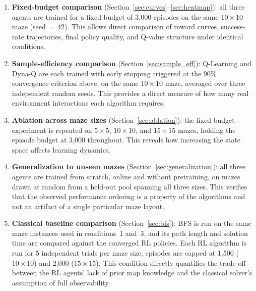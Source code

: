 \documentclass[11pt]{article}
\begin{document}
\begin{enumerate}
    \item \textbf{Fixed-budget comparison} (Section~\ref{sec:curves}--\ref{sec:heatmap}):
    all three agents are trained for a fixed budget of 3{,}000 episodes
    on the same $10\times10$ maze (seed $= 42$). This allows direct
    comparison of reward curves, success-rate trajectories, final policy
    quality, and Q-value structure under identical conditions.

    \item \textbf{Sample-efficiency comparison}
    (Section~\ref{sec:sample_eff}): Q-Learning and Dyna-Q are each trained
    with early stopping triggered at the 90\% convergence criterion above,
    on the same $10\times10$ maze, averaged over three independent random
    seeds. This provides a direct measure of how many real environment
    interactions each algorithm requires.

    \item \textbf{Ablation across maze sizes}
    (Section~\ref{sec:ablation}): the fixed-budget experiment is repeated
    on $5\times5$, $10\times10$, and $15\times15$ mazes, holding the
    episode budget at 3{,}000 throughout. This reveals how increasing the
    state space affects learning dynamics.

    \item \textbf{Generalization to unseen mazes}
    (Section~\ref{sec:generalization}): all three agents are trained from
    scratch, online and without pretraining, on mazes drawn at random from
    a held-out pool spanning all three sizes. This verifies that the
    observed performance ordering is a property of the algorithms and not
    an artifact of a single particular maze layout.

    \item \textbf{Classical baseline comparison}
    (Section~\ref{sec:bfs}): BFS is run on the same maze instances used
    in conditions~1 and~3, and its path length and solution time are
    compared against the converged RL policies. Each RL algorithm is
    run for 5 independent trials per maze size; episodes are capped at
    1{,}500 ($10\times10$) and 2{,}000 ($15\times15$). This condition
    directly quantifies the trade-off between the RL agents' lack of
    prior map knowledge and the classical solver's assumption of full
    observability.
\end{enumerate}

\end{document}
